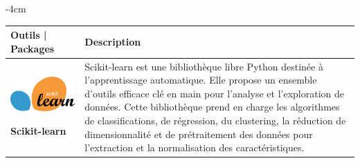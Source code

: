 \begin{table}[H]
	\centering
	\addtolength{\leftskip} {-4cm}
	\addtolength{\rightskip}{-4.5cm}
	\begin{tabular}{|m{5cm}|m{12cm}|}
	\hline
	\rowcolor{blueforest}
	\color{white} \textbf{Outils | Packages} & \color{white} \textbf{Description}  \\
	\hline\hline
	\begin{center}
		\begin{minipage}{.3\textwidth}
		\includegraphics[width=\textwidth]{images/chapitre7/scikit_learn.png}
	  \end{minipage}
	  \end{center}
	  \centering \textbf{Scikit-learn} \cite{pedregosa2011scikit} & Scikit-learn est une bibliothèque libre Python destinée à l'apprentissage automatique. Elle propose un ensemble d'outils efficace clé en main pour l’analyse et l’exploration de données. Cette bibliothèque prend en charge les algorithmes de classifications, de régression, du clustering, la réduction de dimensionnalité et de prétraitement des données pour l'extraction et la normalisation des caractéristiques.  \\ \hline
	

\end{tabular}
\end{table}
